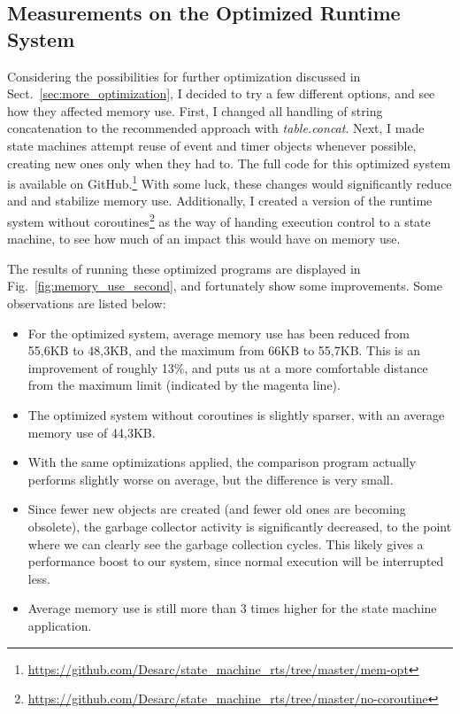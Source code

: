 \subsection{Measurements on the Optimized Runtime System}
\label{sec:opt_rts}
Considering the possibilities for further optimization discussed in Sect.~\ref{sec:more_optimization}, I decided to try a few different options, and see how they affected memory use. First, I changed all handling of string concatenation to the recommended approach with \emph{table.concat}. Next, I made state machines attempt reuse of event and timer objects whenever possible, creating new ones only when they had to. The full code for this optimized system is available on GitHub.\footnote{\url{https://github.com/Desarc/state_machine_rts/tree/master/mem-opt}} With some luck, these changes would significantly reduce and and stabilize memory use. Additionally, I created a version of the runtime system without coroutines\footnote{\url{https://github.com/Desarc/state_machine_rts/tree/master/no-coroutine}} as the way of handing execution control to a state machine, to see how much of an impact this would have on memory use.

\noindent
The results of running these optimized programs are displayed in Fig.~\ref{fig:memory_use_second}, and fortunately show some improvements. Some observations are listed below:

\begin{itemize}
	\item For the optimized system, average memory use has been reduced from 55,6KB to 48,3KB, and the maximum from 66KB to 55,7KB. This is an improvement of roughly 13\%, and puts us at a more comfortable distance from the maximum limit (indicated by the magenta line).
	\item The optimized system without coroutines is slightly sparser, with an average memory use of 44,3KB.
	\item With the same optimizations applied, the comparison program actually performs slightly worse on average, but the difference is very small.
	\item Since fewer new objects are created (and fewer old ones are becoming obsolete), the garbage collector activity is significantly decreased, to the point where we can clearly see the garbage collection cycles. This likely gives a performance boost to our system, since normal execution will be interrupted less.
	\item Average memory use is still more than 3 times higher for the state machine application.
\end{itemize}

